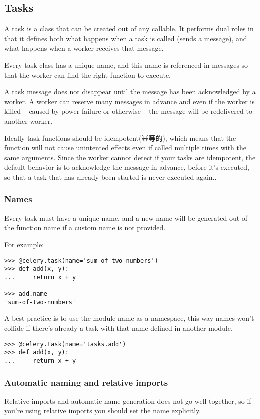 \documentclass[9pt,a4paper]{article}
\begin{document}
\begin{CJK*}{GBK}{kai}
\subsection{Tasks}
A task is a class that can be created out of any callable. It performs dual roles in that it defines both what happens when a task is called (sends a message), and what happens when a worker receives that message.

Every task class has a unique name, and this name is referenced in messages so that the worker can find the right function to execute.

A task message does not disappear until the message has been acknowledged by a worker. A worker can reserve many messages in advance and even if the worker is killed – caused by power failure or otherwise – the message will be redelivered to another worker.

Ideally task functions should be idempotent(幂等的), which means that the function will not cause unintented effects even if called multiple times with the same arguments. Since the worker cannot detect if your tasks are idempotent, the default behavior is to acknowledge the message in advance, before it\textquoteright s executed, so that a task that has already been started is never executed again..

\subsubsection{Names}
Every task must have a unique name, and a new name will be generated out of the function name if a custom name is not provided.

For example:

\begin{Verbatim}[frame=single]
>>> @celery.task(name='sum-of-two-numbers')
>>> def add(x, y):
...     return x + y

>>> add.name
'sum-of-two-numbers'
\end{Verbatim}

A best practice is to use the module name as a namespace, this way names won\textquoteright t collide if there\textquoteright s already a task with that name defined in another module.

\begin{Verbatim}[frame=single]
>>> @celery.task(name='tasks.add')
>>> def add(x, y):
...     return x + y
\end{Verbatim}

\subsubsection{Automatic naming and relative imports}
Relative imports and automatic name generation does not go well together, so if you\textquoteright re using relative imports you should set the name explicitly.


\end{CJK*}
\end{document}
